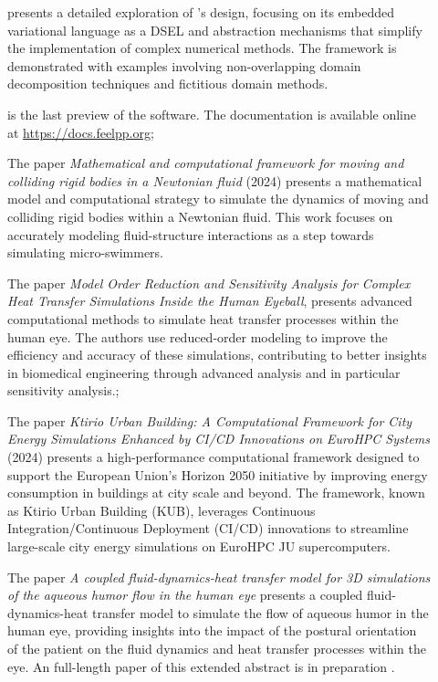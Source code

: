 \begin{description}
        \item[] presents a detailed exploration of \Feelpp's design, focusing on its embedded variational language as a \ac{DSEL} and abstraction mechanisms that simplify the implementation of complex numerical methods. The framework is demonstrated with examples involving non-overlapping domain decomposition techniques and fictitious domain methods.
        \item[] is the last preview of the \Feelpp software. The documentation is available online at \url{https://docs.feelpp.org};
        \item[] The paper \emph{Mathematical and computational framework for moving and colliding rigid bodies in a Newtonian fluid} (2024) presents a mathematical model and computational strategy to simulate the dynamics of moving and colliding rigid bodies within a Newtonian fluid. This work focuses on accurately modeling fluid-structure interactions as a step towards simulating micro-swimmers.
        \item[] The paper \emph{Model Order Reduction and Sensitivity Analysis for Complex Heat Transfer Simulations Inside the Human Eyeball}, presents advanced computational methods to simulate heat transfer processes within the human eye. The authors use reduced-order modeling to improve the efficiency and accuracy of these simulations, contributing to better insights in biomedical engineering through advanced analysis and in particular sensitivity analysis.;
        \item[] The paper \emph{Ktirio Urban Building: A Computational Framework for City Energy Simulations Enhanced by CI/CD Innovations on EuroHPC Systems} (2024) presents a high-performance computational framework designed to support the European Union's Horizon 2050 initiative by improving energy consumption in buildings at city scale and beyond. The framework, known as Ktirio Urban Building (KUB), leverages Continuous Integration/Continuous Deployment (CI/CD) innovations to streamline large-scale city energy simulations on EuroHPC JU supercomputers.
        \item[] The paper \emph{A coupled fluid-dynamics-heat transfer model for 3D simulations of the aqueous humor flow in the human eye} presents a coupled fluid-dynamics-heat transfer model to simulate the flow of aqueous humor in the human eye, providing insights into the impact of the postural orientation of the patient on the fluid dynamics and heat transfer processes within the eye. An full-length paper of this extended abstract is in preparation \cite{saigre_coupled_2024_paper}.

\end{description}
